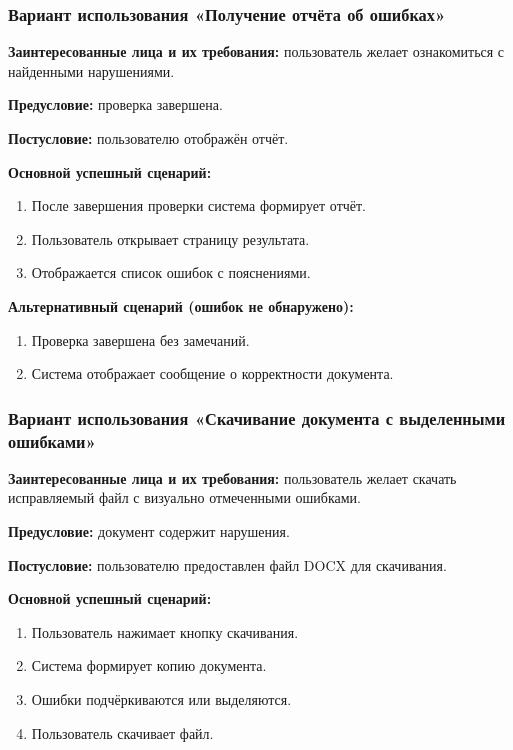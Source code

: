\subsubsection{Вариант использования «Получение отчёта об ошибках»}

\textbf{Заинтересованные лица и их требования:} пользователь желает ознакомиться с найденными нарушениями.

\textbf{Предусловие:} проверка завершена.

\textbf{Постусловие:} пользователю отображён отчёт.

\textbf{Основной успешный сценарий:}

\begin{enumerate}
	\item После завершения проверки система формирует отчёт.
	\item Пользователь открывает страницу результата.
	\item Отображается список ошибок с пояснениями.
\end{enumerate}

\textbf{Альтернативный сценарий (ошибок не обнаружено):}

\begin{enumerate}
	\item Проверка завершена без замечаний.
	\item Система отображает сообщение о корректности документа.
\end{enumerate}

\subsubsection{Вариант использования «Скачивание документа с выделенными ошибками»}

\textbf{Заинтересованные лица и их требования:} пользователь желает скачать исправляемый файл с визуально отмеченными ошибками.

\textbf{Предусловие:} документ содержит нарушения.

\textbf{Постусловие:} пользователю предоставлен файл DOCX для скачивания.

\textbf{Основной успешный сценарий:}

\begin{enumerate}
	\item Пользователь нажимает кнопку скачивания.
	\item Система формирует копию документа.
	\item Ошибки подчёркиваются или выделяются.
	\item Пользователь скачивает файл.
\end{enumerate}


